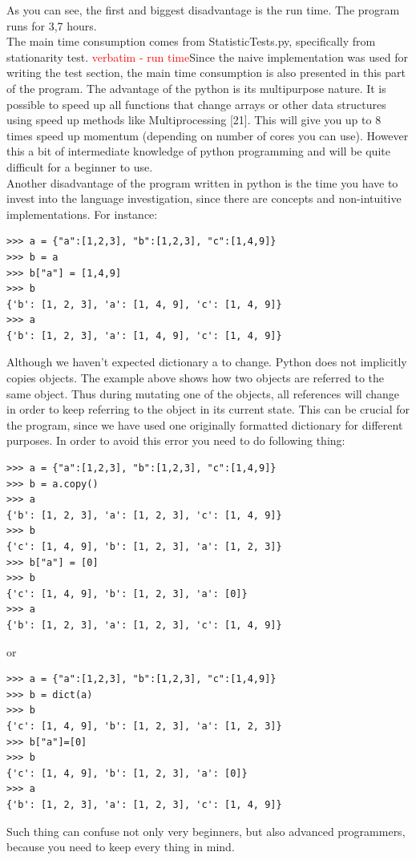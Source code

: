 \documentclass{article}
\begin{document}
As you can see, the first and biggest disadvantage is the run time. The program runs for 3,7 hours.\\
 The main time consumption comes from StatisticTests.py, specifically from stationarity test. \textcolor{red}{verbatim - run time}Since the naive implementation was used for writing the test section, the main time consumption is also presented in this part of the program. The advantage of the python is its multipurpose nature. It is possible to speed up all functions that change arrays or other data structures using speed up methods like Multiprocessing [21]. This will give you up to 8 times speed up momentum (depending on number of cores you can use). However this a bit of intermediate knowledge of python programming and will be quite difficult for a beginner to use.\\
Another disadvantage of the program written in python is the time you have to invest into the language investigation, since there are concepts and non-intuitive implementations. For instance:
\begin{verbatim}
>>> a = {"a":[1,2,3], "b":[1,2,3], "c":[1,4,9]}
>>> b = a
>>> b["a"] = [1,4,9]
>>> b
{'b': [1, 2, 3], 'a': [1, 4, 9], 'c': [1, 4, 9]}
>>> a
{'b': [1, 2, 3], 'a': [1, 4, 9], 'c': [1, 4, 9]}
\end{verbatim} 
Although we haven't expected dictionary a to change. Python does not implicitly copies objects. The example above shows how two objects are referred to the same object. Thus during mutating one of the objects, all references will change in order to keep referring to the object in its current state. This can be crucial for the program, since we have used one originally formatted dictionary for different purposes. In order to avoid this error you need to do following thing:     
\begin{verbatim}
>>> a = {"a":[1,2,3], "b":[1,2,3], "c":[1,4,9]}
>>> b = a.copy()
>>> a
{'b': [1, 2, 3], 'a': [1, 2, 3], 'c': [1, 4, 9]}
>>> b
{'c': [1, 4, 9], 'b': [1, 2, 3], 'a': [1, 2, 3]}
>>> b["a"] = [0]
>>> b
{'c': [1, 4, 9], 'b': [1, 2, 3], 'a': [0]}
>>> a
{'b': [1, 2, 3], 'a': [1, 2, 3], 'c': [1, 4, 9]}
\end{verbatim}
or 
\begin{verbatim}
>>> a = {"a":[1,2,3], "b":[1,2,3], "c":[1,4,9]}
>>> b = dict(a)
>>> b
{'c': [1, 4, 9], 'b': [1, 2, 3], 'a': [1, 2, 3]}
>>> b["a"]=[0]
>>> b
{'c': [1, 4, 9], 'b': [1, 2, 3], 'a': [0]}
>>> a
{'b': [1, 2, 3], 'a': [1, 2, 3], 'c': [1, 4, 9]}
\end{verbatim}
Such thing can confuse not only very beginners, but also advanced programmers, because you need to keep every thing in mind.\\
\end{document}
